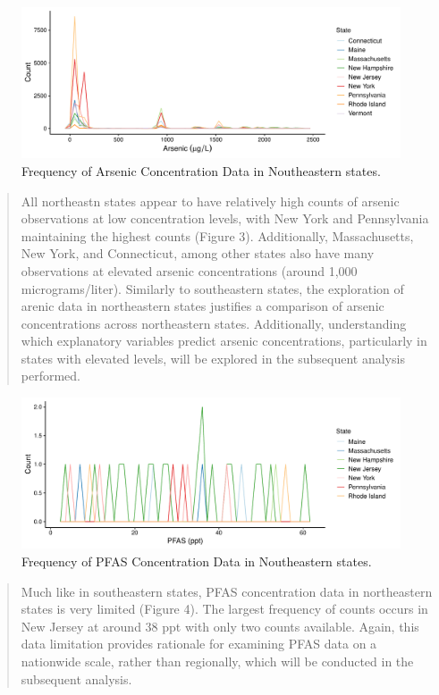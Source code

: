 \documentclass[12pt,]{article}
\begin{document}
\begin{figure}
\centering
\includegraphics{Project_Template_files/figure-latex/figs3-1.pdf}
\caption{Frequency of Arsenic Concentration Data in Noutheastern
states.}
\end{figure}

\begin{quote}
All northeastn states appear to have relatively high counts of arsenic
observations at low concentration levels, with New York and Pennsylvania
maintaining the highest counts (Figure 3). Additionally, Massachusetts,
New York, and Connecticut, among other states also have many
observations at elevated arsenic concentrations (around 1,000
micrograms/liter). Similarly to southeastern states, the exploration of
arenic data in northeastern states justifies a comparison of arsenic
concentrations across northeastern states. Additionally, understanding
which explanatory variables predict arsenic concentrations, particularly
in states with elevated levels, will be explored in the subsequent
analysis performed.
\end{quote}

\begin{figure}
\centering
\includegraphics{Project_Template_files/figure-latex/figs4-1.pdf}
\caption{Frequency of PFAS Concentration Data in Noutheastern states.}
\end{figure}

\begin{quote}
Much like in southeastern states, PFAS concentration data in
northeastern states is very limited (Figure 4). The largest frequency of
counts occurs in New Jersey at around 38 ppt with only two counts
available. Again, this data limitation provides rationale for examining
PFAS data on a nationwide scale, rather than regionally, which will be
conducted in the subsequent analysis.
\end{quote}
\end{document}
